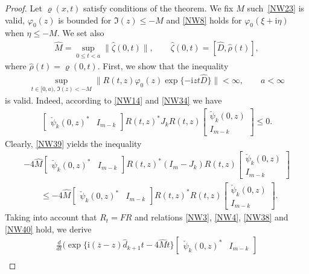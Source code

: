 \documentclass[pdftex]{sigma}
\def\vr{\varrho}
\def\vp{\varphi}
\def\wh{\widehat}
\def\ov{\overline}
\newcommand{\I}{\mathrm{i}}
\numberwithin{equation}{section}
\begin{document}
\begin{proof}
Let $\vr(x,t)$ satisfy conditions of the theorem. We f\/ix $M$ such~\eqref{NW23} is valid, $\vp_0(z)$ is bounded for $\Im(z)\leq -M$ and \eqref{NW8} holds for $\vp_0(\xi+\I \eta)$ when $\eta \leq -M$. We
set also
\begin{gather} \label{NW38}
\wh M=\sup_{0\leq t<a}\| \wh \zeta(0,t)\|, \qquad \wh \zeta(0,t)=[\wh D, \wh \rho(t)],
\end{gather}
where $\wh \rho(t)=\vr(0,t)$. First, we show that the inequality
\begin{gather} \label{NW38!}
\sup_{t\in [0,a), \, \Im(z)<-M}\|R(t,z)\vp_0(z)\exp\{-\I z t \wh D\}\|<\infty, \qquad a<\infty
\end{gather}
is valid. Indeed, according to \eqref{NW14} and \eqref{NW34} we have
\begin{gather} \label{NW39}
\begin{bmatrix}\breve \psi_k( 0,z)^* & I_{m-k} \end{bmatrix} R(t,z)^* J_k
R(t,z)\begin{bmatrix}\breve \psi_k(0,z) \\ I_{m-k} \end{bmatrix}
\leq 0.
\end{gather}
Clearly, \eqref{NW39} yields the inequality
\begin{gather} \nonumber
 - 4 \wh M \begin{bmatrix}\breve \psi_k( 0,z)^* & I_{m-k} \end{bmatrix} R(t,z)^* (I_m-J_k)
R(t,z)\begin{bmatrix}\breve \psi_k(0,z) \\ I_{m-k} \end{bmatrix}
\\ \label{NW40} \qquad{}
\leq - 4 \wh M \begin{bmatrix}\breve \psi_k( 0,z)^* & I_{m-k} \end{bmatrix} R(t,z)^*
R(t,z)\begin{bmatrix}\breve \psi_k(0,z) \\ I_{m-k} \end{bmatrix} .
\end{gather}
Taking into account that $R_t=FR$ and relations \eqref{NW3}, \eqref{NW4}, \eqref{NW38} and \eqref{NW40} hold, we derive
\begin{gather}
\frac{d}{d t}\bigg(\exp\{\I(\ov z -z)\wh d_{k+1} t - 4 \wh M t\}
\begin{bmatrix} \breve \psi_k( 0,z)^* & I_{m-k} \end{bmatrix}\nonumber\\

\end{gather}
\end{proof}
\end{document}
